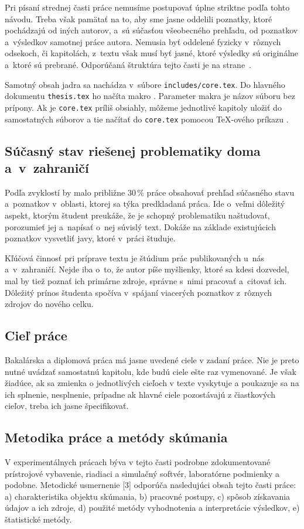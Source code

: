 Pri písaní strednej časti práce nemusíme postupovať úplne
striktne podľa tohto návodu.
Treba však pamätať na to,
aby sme jasne oddelili poznatky,
ktoré pochádzajú od iných autorov,
a~sú súčasťou všeobecného prehľadu,
od poznatkov a~výsledkov samotnej práce autora.
Nemusia byť oddelené fyzicky v~rôznych odsekoch,
či kapitolách, z~textu však musí byť jasné,
ktoré výsledky sú originálne a~ktoré sú prebrané.
Odporúčaná štruktúra tejto časti je na
strane~\pageref{sec:StrukturaPrace}.

Samotný obsah jadra sa nachádza v~súbore \verb|includes/core.tex|.
Do hlavného dokumentu \verb|thesis.tex| ho načíta makro \verb||.
Parameter makra je názov súboru bez prípony.
Ak je \verb|core.tex| príliš obsiahly,
môžeme jednotlivé kapitoly uložiť do samostatných
súborov a tie načítať do \verb|core.tex|
pomocou \TeX-ového príkazu \verb||.

\subsection*{\normalsize Súčasný stav riešenej problematiky
doma a~v~zahraničí}
Podľa zvyklostí by malo približne 30\,\% práce obsahovať prehľad
súčasného stavu a~poznatkov v~oblasti,
ktorej sa týka predkladaná práca.
Ide o~veľmi dôležitý aspekt,
ktorým študent preukáže,
že je schopný problematiku naštudovať,
porozumieť jej a~napísať o~nej súvislý text.
Dokáže na základe existujúcich poznatkov vysvetliť javy,
ktoré v~práci študuje.

Kľúčová činnosť pri príprave textu je štúdium prác publikovaných
u~nás a~v~zahraničí.
Nejde iba o~to, že autor píše myšlienky, ktoré sa kdesi dozvedel,
mal by tiež poznať ich primárne zdroje,
správne s~nimi pracovať a~citovať ich.
Dôležitý prínos študenta spočíva v~spájaní viacerých poznatkov
z~rôznych zdrojov do nového celku.

\subsection*{\normalsize Cieľ práce}
Bakalárska a diplomová práca má jasne uvedené ciele v zadaní práce. Nie je preto nutné uvádzať samostatnú kapitolu, kde budú ciele ešte raz vymenované. Je však žiadúce, ak sa zmienka o jednotlivých cieľoch v texte vyskytuje a poukazuje sa na ich splnenie, nesplnenie, prípadne ak hlavné ciele pozostávajú z čiastkových cieľov, treba ich jasne špecifikovať.

\subsection*{\normalsize Metodika práce a metódy skúmania}
V experimentálnych prácach býva v tejto časti podrobne zdokumentované prístrojové vybavenie, riadiaci a simulačný softvér, laboratórne podmienky a podobne. Metodické usmernenie [3] odporúča nasledujúci obsah tejto časti práce: a) charakteristika objektu skúmania, b) pracovné postupy, c) spôsob získavania údajov a ich zdroje, d) použité metódy vyhodnotenia a interpretácie výsledkov, e) štatistické metódy.

